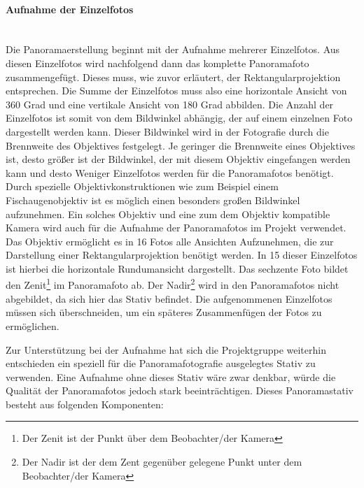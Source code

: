 \paragraph{Aufnahme der Einzelfotos} \hfill \\

Die Panoramaerstellung beginnt mit der Aufnahme mehrerer Einzelfotos. Aus diesen
Einzelfotos wird nachfolgend dann das komplette Panoramafoto zusammengefügt.
Dieses muss, wie zuvor erläutert, der Rektangularprojektion entsprechen. Die
Summe der Einzelfotos muss also eine horizontale Ansicht von 360 Grad und eine
vertikale Ansicht von 180 Grad abbilden. Die Anzahl der Einzelfotos ist somit
von dem Bildwinkel abhängig, der auf einem einzelnen Foto dargestellt werden
kann. Dieser Bildwinkel wird in der Fotografie durch die Brennweite des
Objektives festgelegt. Je geringer die Brennweite eines Objektives ist, desto
größer ist der Bildwinkel, der mit diesem Objektiv eingefangen werden kann und
desto Weniger Einzelfotos werden für die Panoramafotos benötigt. Durch
spezielle Objektivkonstruktionen wie zum Beispiel einem Fischaugenobjektiv ist
es möglich einen besonders großen Bildwinkel aufzunehmen. Ein solches Objektiv
und eine zum dem Objektiv kompatible Kamera wird auch für die Aufnahme der
Panoramafotos im Projekt verwendet. Das Objektiv ermöglicht es in 16 Fotos alle
Ansichten Aufzunehmen, die zur Darstellung einer Rektangularprojektion benötigt
werden. In 15 dieser Einzelfotos ist hierbei die horizontale Rundumansicht
dargestellt. Das sechzente Foto bildet den Zenit\footnote{Der Zenit ist der
Punkt über dem Beobachter/der Kamera} im Panoramafoto ab. Der
Nadir\footnote{Der Nadir ist der dem Zent gegenüber gelegene Punkt unter dem
Beobachter/der Kamera} wird in den Panoramafotos nicht abgebildet, da sich hier
das Stativ befindet. Die aufgenommenen Einzelfotos müssen sich überschneiden,
um ein späteres Zusammenfügen der Fotos zu ermöglichen.

Zur Unterstützung bei der Aufnahme hat sich die Projektgruppe weiterhin
entschieden ein speziell für die Panoramafotografie ausgelegtes Stativ zu
verwenden. Eine Aufnahme ohne dieses Stativ wäre zwar denkbar, würde die
Qualität der Panoramafotos jedoch stark beeinträchtigen. Dieses Panoramastativ
besteht aus folgenden Komponenten:

